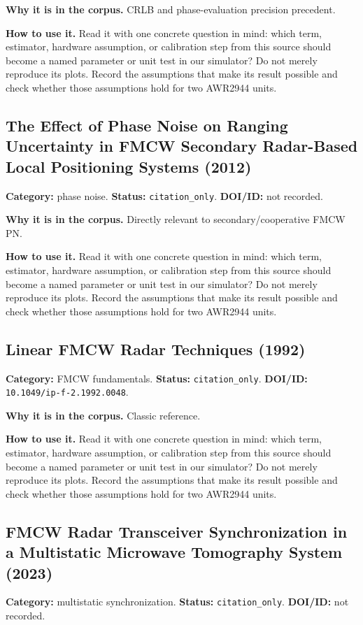 \documentclass[11pt]{article}
\begin{document}
\textbf{Why it is in the corpus.} CRLB and phase-evaluation precision precedent.

\textbf{How to use it.} Read it with one concrete question in mind: which term, estimator, hardware assumption, or calibration step from this source should become a named parameter or unit test in our simulator? Do not merely reproduce its plots. Record the assumptions that make its result possible and check whether those assumptions hold for two AWR2944 units.

\subsection*{The Effect of Phase Noise on Ranging Uncertainty in FMCW Secondary Radar-Based Local Positioning Systems (2012)}
\textbf{Category:} phase noise. \textbf{Status:} \nolinkurl{citation_only}. \textbf{DOI/ID:} not recorded.

\textbf{Why it is in the corpus.} Directly relevant to secondary/cooperative FMCW PN.

\textbf{How to use it.} Read it with one concrete question in mind: which term, estimator, hardware assumption, or calibration step from this source should become a named parameter or unit test in our simulator? Do not merely reproduce its plots. Record the assumptions that make its result possible and check whether those assumptions hold for two AWR2944 units.

\subsection*{Linear FMCW Radar Techniques (1992)}
\textbf{Category:} FMCW fundamentals. \textbf{Status:} \nolinkurl{citation_only}. \textbf{DOI/ID:} \nolinkurl{10.1049/ip-f-2.1992.0048}.

\textbf{Why it is in the corpus.} Classic reference.

\textbf{How to use it.} Read it with one concrete question in mind: which term, estimator, hardware assumption, or calibration step from this source should become a named parameter or unit test in our simulator? Do not merely reproduce its plots. Record the assumptions that make its result possible and check whether those assumptions hold for two AWR2944 units.

\subsection*{FMCW Radar Transceiver Synchronization in a Multistatic Microwave Tomography System (2023)}
\textbf{Category:} multistatic synchronization. \textbf{Status:} \nolinkurl{citation_only}. \textbf{DOI/ID:} not recorded.
\end{document}
